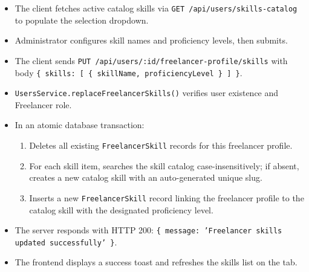 \begin{itemize}[leftmargin=1.6em,topsep=3pt,itemsep=2pt,parsep=0pt,label=$\bullet$]
    \item The client fetches active catalog skills via \texttt{GET /api/users/skills-catalog} to populate the selection dropdown.
    \item Administrator configures skill names and proficiency levels, then submits.
    \item The client sends \texttt{PUT /api/users/:id/freelancer-profile/skills} with body \texttt{\{ skills: [ \{ skillName, proficiencyLevel \} ] \}}.
    \item \texttt{UsersService.replaceFreelancerSkills()} verifies user existence and Freelancer role.
    \item In an atomic database transaction:
        \begin{enumerate}[leftmargin=1.6em,topsep=2pt,itemsep=2pt,parsep=0pt]
            \item Deletes all existing \texttt{FreelancerSkill} records for this freelancer profile.
            \item For each skill item, searches the skill catalog case-insensitively; if absent, creates a new catalog skill with an auto-generated unique slug.
            \item Inserts a new \texttt{FreelancerSkill} record linking the freelancer profile to the catalog skill with the designated proficiency level.
        \end{enumerate}
    \item The server responds with HTTP 200: \texttt{\{ message: 'Freelancer skills updated successfully' \}}.
    \item The frontend displays a success toast and refreshes the skills list on the tab.
\end{itemize}

